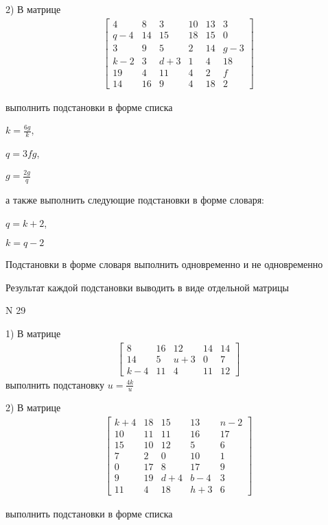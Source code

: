 \documentclass[11pt]{report}
\begin{document}
    2) В матрице
\begin{align*}
\left[\begin{matrix}4 & 8 & 3 & 10 & 13 & 3\\q - 4 & 14 & 15 & 18 & 15 & 0\\3 & 9 & 5 & 2 & 14 & g - 3\\k - 2 & 3 & d + 3 & 1 & 4 & 18\\19 & 4 & 11 & 4 & 2 & f\\14 & 16 & 9 & 4 & 18 & 2\end{matrix}\right]
\end{align*}

выполнить подстановки в форме списка

$k=\frac{6 g}{k}$,

$q=3 f g$,

$g=\frac{2 g}{q}$

а также выполнить следующие подстановки в форме словаря:

$q=k + 2$,

$k=q - 2$


    Подстановки в форме словаря выполнить одновременно и не одновременно


    Результат каждой подстановки выводить в виде отдельной матрицы

\newpage
N 29


    1) В матрице
\begin{align*}
\left[\begin{matrix}8 & 16 & 12 & 14 & 14\\14 & 5 & u + 3 & 0 & 7\\k - 4 & 11 & 4 & 11 & 12\end{matrix}\right]
\end{align*}
выполнить подстановку $u=\frac{4 k}{u}$


    2) В матрице
\begin{align*}
\left[\begin{matrix}k + 4 & 18 & 15 & 13 & n - 2\\10 & 11 & 11 & 16 & 17\\15 & 10 & 12 & 5 & 6\\7 & 2 & 0 & 10 & 1\\0 & 17 & 8 & 17 & 9\\9 & 19 & d + 4 & b - 4 & 3\\11 & 4 & 18 & h + 3 & 6\end{matrix}\right]
\end{align*}

выполнить подстановки в форме списка
\end{document}
